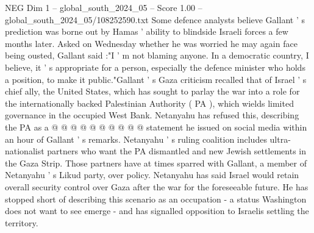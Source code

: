 \begin{textsample}{NEG Dim 1 – global\_south\_2024\_05 – Score 1.00 – global\_south\_2024\_05/108252590.txt}
Some defence analysts believe Gallant ' s prediction was borne out by Hamas ' ability to blindside Israeli forces a few months later.
Asked on Wednesday whether he was worried he may again face being ousted, Gallant said :"I ' m not blaming anyone.
In a democratic country, I believe, it ' s appropriate for a person, especially the defence minister who holds a position, to make it public."Gallant ' s Gaza criticism recalled that of Israel ' s chief ally, the United States, which has sought to parlay the war into a role for the internationally backed Palestinian Authority ( PA ), which wields limited governance in the occupied West Bank.
Netanyahu has refused this, describing the PA as a @ @ @ @ @ @ @ @ @ @ statement he issued on social media within an hour of Gallant ' s remarks.
Netanyahu ' s ruling coalition includes ultra-nationalist partners who want the PA dismantled and new Jewish settlements in the Gaza Strip.
Those partners have at times sparred with Gallant, a member of Netanyahu ' s Likud party, over policy.
Netanyahu has said Israel would retain overall security control over Gaza after the war for the foreseeable future.
He has stopped short of describing this scenario as an occupation - a status Washington does not want to see emerge - and has signalled opposition to Israelis settling the territory.

\end{textsample}
